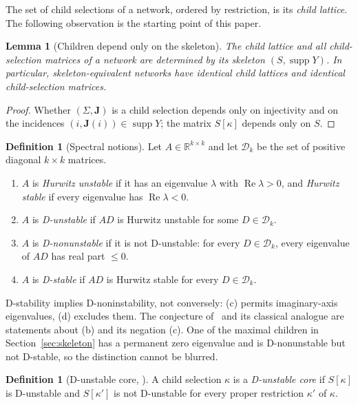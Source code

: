 \documentclass[11pt,a4paper]{article}
\theoremstyle{plain}
\newtheorem{lemma}[theorem]{Lemma}
\theoremstyle{definition}
\newtheorem{definition}[theorem]{Definition}
\theoremstyle{remark}
\newcommand{\R}{\mathbb{R}}
\newcommand{\supp}{\operatorname{supp}}
\newcommand{\Real}{\operatorname{Re}}
\begin{document}
The set of child selections of a network, ordered by restriction, is its \emph{child lattice}. The following observation is the starting point of this paper.

\begin{lemma}[Children depend only on the skeleton]\label{lem:skeleton}
The child lattice and all child-selection matrices of a network are determined by its skeleton $(S,\supp Y)$. In particular, skeleton-equivalent networks have identical child lattices and identical child-selection matrices.
\end{lemma}

\begin{proof}
Whether $(\Sigma,\mathbf J)$ is a child selection depends only on injectivity and on the incidences $(i,\mathbf J(i))\in\supp Y$; the matrix $S[\kappa]$ depends only on $S$.
\end{proof}

\begin{definition}[Spectral notions]\label{def:spectral}
Let $A\in\R^{k\times k}$ and let $\mathcal D_k$ be the set of positive diagonal $k\times k$ matrices.
\begin{enumerate}[label=(\alph*)]
\item $A$ is \emph{Hurwitz unstable} if it has an eigenvalue $\lambda$ with $\Real\lambda>0$, and \emph{Hurwitz stable} if every eigenvalue has $\Real\lambda<0$.
\item $A$ is \emph{D-unstable} if $AD$ is Hurwitz unstable for some $D\in\mathcal D_k$.
\item $A$ is \emph{D-nonunstable} if it is not D-unstable: for every $D\in\mathcal D_k$, every eigenvalue of $AD$ has real part $\le0$.
\item $A$ is \emph{D-stable} if $AD$ is Hurwitz stable for every $D\in\mathcal D_k$.
\end{enumerate}
\end{definition}

D-stability implies D-noninstability, not conversely: (c) permits imaginary-axis eigenvalues, (d) excludes them. The conjecture of~\cite{VassenaStadler2024} and its classical analogue are statements about (b) and its negation (c). One of the maximal children in Section~\ref{sec:skeleton} has a permanent zero eigenvalue and is D-nonunstable but not D-stable, so the distinction cannot be blurred.

\begin{definition}[D-unstable core, {\cite[Def.~16]{VassenaStadler2024}}]
A child selection $\kappa$ is a \emph{D-unstable core} if $S[\kappa]$ is D-unstable and $S[\kappa']$ is not D-unstable for every proper restriction $\kappa'$ of $\kappa$.
\end{definition}
\end{document}
